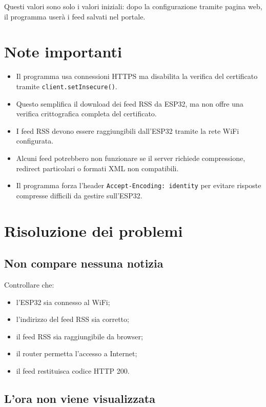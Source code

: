 \documentclass[11pt,a4paper]{article}
\begin{document}
	Questi valori sono solo i valori iniziali: dopo la configurazione tramite pagina web, il programma userà i feed salvati nel portale.
	
	\section{Note importanti}
	
	\begin{itemize}
		\item Il programma usa connessioni HTTPS ma disabilita la verifica del certificato tramite \texttt{client.setInsecure()}.
		\item Questo semplifica il download dei feed RSS da ESP32, ma non offre una verifica crittografica completa del certificato.
		\item I feed RSS devono essere raggiungibili dall'ESP32 tramite la rete WiFi configurata.
		\item Alcuni feed potrebbero non funzionare se il server richiede compressione, redirect particolari o formati XML non compatibili.
		\item Il programma forza l'header \texttt{Accept-Encoding: identity} per evitare risposte compresse difficili da gestire sull'ESP32.
	\end{itemize}
	
	\section{Risoluzione dei problemi}
	
	\subsection{Non compare nessuna notizia}
	
	Controllare che:
	
	\begin{itemize}
		\item l'ESP32 sia connesso al WiFi;
		\item l'indirizzo del feed RSS sia corretto;
		\item il feed RSS sia raggiungibile da browser;
		\item il router permetta l'accesso a Internet;
		\item il feed restituisca codice HTTP 200.
	\end{itemize}
	
	\subsection{L'ora non viene visualizzata}
	
\end{document}
